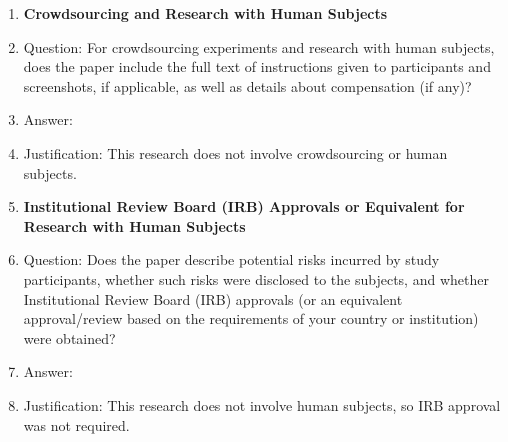\documentclass{article}
\begin{document}
\begin{enumerate}
\item {\bf Crowdsourcing and Research with Human Subjects}
    \item[] Question: For crowdsourcing experiments and research with human subjects, does the paper include the full text of instructions given to participants and screenshots, if applicable, as well as details about compensation (if any)? 
    \item[] Answer: \answerNA{} 
    \item[] Justification: This research does not involve crowdsourcing or human subjects.

\item {\bf Institutional Review Board (IRB) Approvals or Equivalent for Research with Human Subjects}
    \item[] Question: Does the paper describe potential risks incurred by study participants, whether such risks were disclosed to the subjects, and whether Institutional Review Board (IRB) approvals (or an equivalent approval/review based on the requirements of your country or institution) were obtained?
    \item[] Answer: \answerNA{} 
    \item[] Justification: This research does not involve human subjects, so IRB approval was not required.

\end{enumerate}
\end{document}
